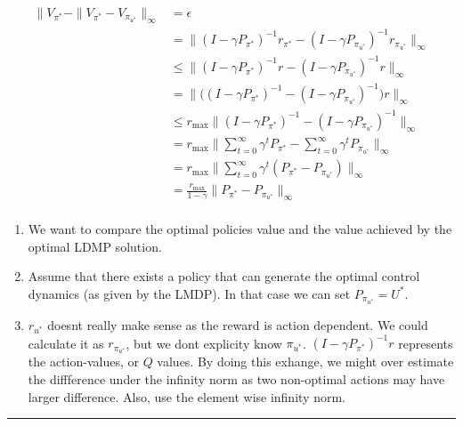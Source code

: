 \begin{align}
\parallel V_{\pi^{* }} - \parallel V_{\pi^{* }} - V_{\pi_{u^{* }}} \parallel_{\infty}&= \epsilon  \tag{1}\\
&=\parallel (I - \gamma P_{\pi^{* }})^{-1}r_{\pi^{* }} - (I - \gamma P_{\pi_{u^{* }}})^{-1}r_{\pi_{u^{* } }} \parallel_{\infty} \tag{2}\\
&\le\parallel (I - \gamma P_{\pi^{* }})^{-1}r - (I - \gamma P_{\pi_{u^{* }}})^{-1}r \parallel_{\infty} \tag{3}\\
&=\parallel \bigg((I - \gamma P_{\pi^{* }})^{-1} - (I - \gamma P_{\pi_{u^{* }}})^{-1} \bigg) r \parallel_{\infty} \tag{4}\\
&\le r_{\text{max}} \parallel (I - \gamma P_{\pi^{* }})^{-1} - (I - \gamma P_{\pi_{u^{* }}})^{-1}   \parallel_{\infty} \tag{5}\\
&= r_{\text{max}} \parallel \sum_{t=0}^{\infty} \gamma^t P_{\pi^{* }} - \sum_{t=0}^{\infty} \gamma^t P_{\pi_{u^{* }}}  \parallel_{\infty} \tag{6}\\
&= r_{\text{max}} \parallel \sum_{t=0}^{\infty} \gamma^t (P_{\pi^{* }} - P_{\pi_{u^{* }}})   \parallel_{\infty} \tag{7}\\
&= \frac{r_{\text{max}}}{1-\gamma} \parallel P_{\pi^{* }} - P_{\pi_{u^{* }}} \parallel_{\infty} \tag{7}\\
\end{align}

\begin{enumerate}
\def\labelenumi{(\arabic{enumi})}
\tightlist
\item
  We want to compare the optimal policies value and the value achieved
  by the optimal LDMP solution.
\item
  Assume that there exists a policy that can generate the optimal
  control dynamics (as given by the LMDP). In that case we can set
  \(P_{\pi_{u^{* }}} = U^{* }\).
\item
  \(r_{u^{* }}\) doesnt really make sense as the reward is action
  dependent. We could calculate it as \(r_{\pi_{u^{* } }}\), but we dont
  explicity know \(\pi_{u^{* }}\). \((I - \gamma P_{\pi^{* }})^{-1}r\)
  represents the action-values, or \(Q\) values. By doing this exhange,
  we might over estimate the diffference under the infinity norm as two
  non-optimal actions may have larger difference. Also, use the element
  wise infinity norm.
\end{enumerate}

\begin{center}\rule{0.5\linewidth}{\linethickness}\end{center}

